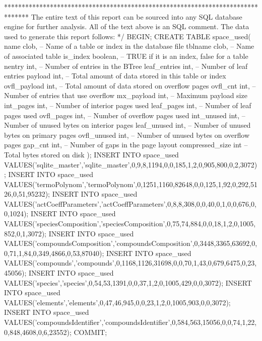 *******************************************************************************
The entire text of this report can be sourced into any SQL database
engine for further analysis.  All of the text above is an SQL comment.
The data used to generate this report follows:
*/
BEGIN;
CREATE TABLE space_used(
   name clob,        -- Name of a table or index in the database file
   tblname clob,     -- Name of associated table
   is_index boolean, -- TRUE if it is an index, false for a table
   nentry int,       -- Number of entries in the BTree
   leaf_entries int, -- Number of leaf entries
   payload int,      -- Total amount of data stored in this table or index
   ovfl_payload int, -- Total amount of data stored on overflow pages
   ovfl_cnt int,     -- Number of entries that use overflow
   mx_payload int,   -- Maximum payload size
   int_pages int,    -- Number of interior pages used
   leaf_pages int,   -- Number of leaf pages used
   ovfl_pages int,   -- Number of overflow pages used
   int_unused int,   -- Number of unused bytes on interior pages
   leaf_unused int,  -- Number of unused bytes on primary pages
   ovfl_unused int,  -- Number of unused bytes on overflow pages
   gap_cnt int,      -- Number of gaps in the page layout
   compressed_size int  -- Total bytes stored on disk
);
INSERT INTO space_used VALUES('sqlite_master','sqlite_master',0,9,8,1194,0,0,185,1,2,0,905,800,0,2,3072);
INSERT INTO space_used VALUES('termoPolynom','termoPolynom',0,1251,1160,82648,0,0,125,1,92,0,292,5126,0,51,95232);
INSERT INTO space_used VALUES('actCoeffParameters','actCoeffParameters',0,8,8,308,0,0,40,0,1,0,0,676,0,0,1024);
INSERT INTO space_used VALUES('speciesComposition','speciesComposition',0,75,74,884,0,0,18,1,2,0,1005,852,0,1,3072);
INSERT INTO space_used VALUES('compoundsComposition','compoundsComposition',0,3448,3365,63692,0,0,71,1,84,0,349,4866,0,53,87040);
INSERT INTO space_used VALUES('compounds','compounds',0,1168,1126,31698,0,0,70,1,43,0,679,6475,0,23,45056);
INSERT INTO space_used VALUES('species','species',0,54,53,1391,0,0,37,1,2,0,1005,429,0,0,3072);
INSERT INTO space_used VALUES('elements','elements',0,47,46,945,0,0,23,1,2,0,1005,903,0,0,3072);
INSERT INTO space_used VALUES('compoundsIdentifier','compoundsIdentifier',0,584,563,15056,0,0,74,1,22,0,848,4608,0,6,23552);
COMMIT;
